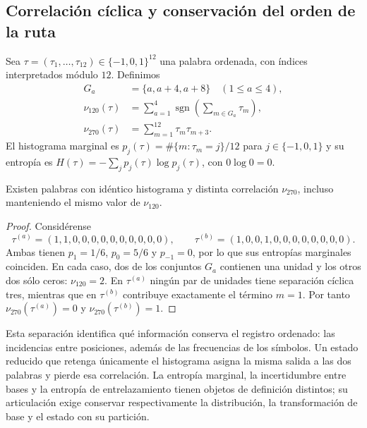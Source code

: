 \subsection{Correlación cíclica y conservación del orden de la ruta}
\label{sec:rec27-memoria}

Sea $\tau=(\tau_1,\ldots,\tau_{12})\in\{-1,0,1\}^{12}$ una palabra
ordenada, con índices interpretados módulo $12$. Definimos
\[
\begin{aligned}
 G_a&=\{a,a+4,a+8\}\quad(1\leq a\leq4),\\
 \nu_{120}(\tau)&=\sum_{a=1}^4\operatorname{sgn}
 \left(\sum_{m\in G_a}\tau_m\right),\\
 \nu_{270}(\tau)&=\sum_{m=1}^{12}\tau_m\tau_{m+3}.
\end{aligned}
\]
El histograma marginal es $p_j(\tau)=\#\{m:\tau_m=j\}/12$ para
$j\in\{-1,0,1\}$ y su entropía es
$H(\tau)=-\sum_j p_j(\tau)\log p_j(\tau)$, con $0\log0=0$.

\begin{proposition}
Existen palabras con idéntico histograma y distinta correlación
$\nu_{270}$, incluso manteniendo el mismo valor de $\nu_{120}$.
\end{proposition}
\begin{proof}
Considérense
\[
 \tau^{(a)}=(1,1,0,0,0,0,0,0,0,0,0,0),\qquad
 \tau^{(b)}=(1,0,0,1,0,0,0,0,0,0,0,0).
\]
Ambas tienen $p_1=1/6$, $p_0=5/6$ y $p_{-1}=0$, por lo que sus
entropías marginales coinciden. En cada caso, dos de los conjuntos $G_a$
contienen una unidad y los otros dos sólo ceros: $\nu_{120}=2$.
En $\tau^{(a)}$ ningún par de unidades tiene separación cíclica tres,
mientras que en $\tau^{(b)}$ contribuye exactamente el término $m=1$.
Por tanto $\nu_{270}(\tau^{(a)})=0$ y $\nu_{270}(\tau^{(b)})=1$.
\end{proof}

Esta separación identifica qué información conserva el registro ordenado:
las incidencias entre posiciones, además de las frecuencias de los símbolos.
Un estado reducido que retenga únicamente el histograma asigna la misma
salida a las dos palabras y pierde esa correlación. La entropía marginal,
la incertidumbre entre bases y la entropía de entrelazamiento tienen objetos
de definición distintos; su articulación exige conservar respectivamente
la distribución, la transformación de base y el estado con su partición.
